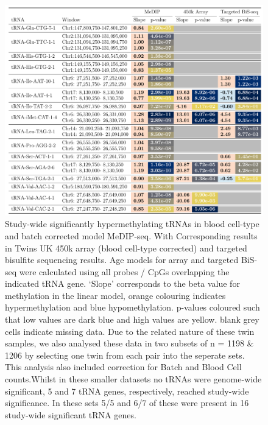 \documentclass[
]{book}
\begin{document}
\begin{figure}

{\centering \includegraphics[width=0.95\linewidth]{./figs/table1a} 

}

\caption{Study-wide significantly hypermethylating tRNAs in blood cell-type and batch corrected model MeDIP-seq. With Corresponding results in Twins UK 450k array (blood cell-type corrected) and targeted bisulfite sequencing results. Age models for array and targeted BiS-seq were calculated using all probes / CpGs overlapping the indicated tRNA gene. `Slope' corresponds to the beta value for methylation in the linear model, orange colouring indicates hypermethylation and blue hypomethylation. p-values coloured such that low values are dark blue and high values are yellow. blank grey cells indicate missing data. Due to the related nature of these twin samples, we also analysed these data in two subsets of n = 1198 \& 1206 by selecting one twin from each pair into the seperate sets. This analysis also included correction for Batch and Blood Cell counts.Whilst in these smaller datasets no tRNAs were genome-wide significant, 5 and 7 tRNA genes, respectively, reached study-wide significance.
In these sets 5/5 and 6/7 of these were present in 16 study-wide significant tRNA genes.}\label{fig:GWSBBtRNAsTab}
\end{figure}
\end{document}
